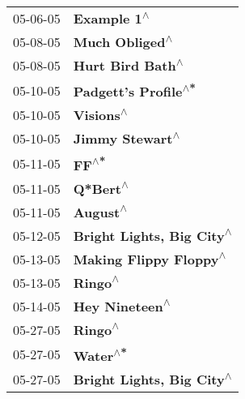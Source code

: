 \begin{supertabular}{p{0.25\columnwidth}p{0.75\columnwidth}}
 05-06-05 &                                                                \textbf{Example 1\textsuperscript{$\wedge$}} \\
 05-08-05 &                                                             \textbf{Much Obliged\textsuperscript{$\wedge$}} \\
 05-08-05 &                                                           \textbf{Hurt Bird Bath\textsuperscript{$\wedge$}} \\
 05-10-05 &                                                       \textbf{Padgett's Profile\textsuperscript{$\wedge$*}} \\
 05-10-05 &                                                                  \textbf{Visions\textsuperscript{$\wedge$}} \\
 05-10-05 &                                                            \textbf{Jimmy Stewart\textsuperscript{$\wedge$}} \\
 05-11-05 &                                                                      \textbf{FF\textsuperscript{$\wedge$*}} \\
 05-11-05 &                                                                   \textbf{Q*Bert\textsuperscript{$\wedge$}} \\
 05-11-05 &                                                                   \textbf{August\textsuperscript{$\wedge$}} \\
 05-12-05 &                                                  \textbf{Bright Lights, Big City\textsuperscript{$\wedge$}} \\
 05-13-05 &                                                     \textbf{Making Flippy Floppy\textsuperscript{$\wedge$}} \\
 05-13-05 &                                                                    \textbf{Ringo\textsuperscript{$\wedge$}} \\
 05-14-05 &                                                             \textbf{Hey Nineteen\textsuperscript{$\wedge$}} \\
 05-27-05 &                                                                    \textbf{Ringo\textsuperscript{$\wedge$}} \\
 05-27-05 &                                                                   \textbf{Water\textsuperscript{$\wedge$*}} \\
 05-27-05 &                                                  \textbf{Bright Lights, Big City\textsuperscript{$\wedge$}} \\

\end{supertabular}
